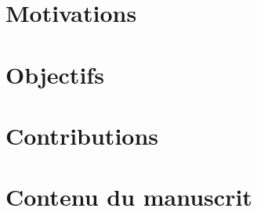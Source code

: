 \begin{bibunit}
\section*{Motivations}

\section*{Objectifs}

\section*{Contributions}

\section*{Contenu du manuscrit}


\end{bibunit}
